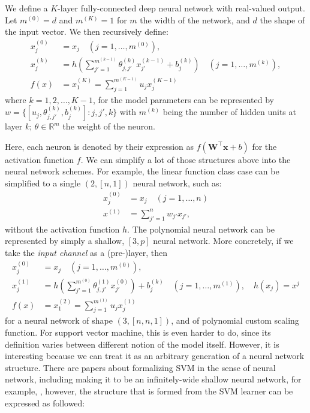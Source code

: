 \begin{definition}
    We define a $K$-layer fully-connected deep neural network with real-valued output. Let $m^{(0)}=d$ and $m^{(K)}=1$ for $m$ the width of the network, and $d$ the shape of the input vector. We then recursively define: 
\begin{align}
    x_{j}^{(0)} &= x_{j} \quad (j=1,\dots,m^{(0)}),\\ 
    x_{j}^{(k)} &= h\left(\sum^{m^{(k-1)}}_{j'=1} \theta_{j,j'}^{(k)}x_{j'}^{(k-1)}+ b_{j}^{(k)}\right)\quad (j=1,\dots,m^{(k)}),\\
    f(x) & = x_{1}^{(K)} = \sum^{m^{(K-1)}}_{j=1} u_{j}x_{j}^{(K-1)}
\end{align}
where $k = 1,2,\dots,K-1$, for the model parameters can be represented by $w=\{[u_{j}, \theta_{j,j'}^{(k)}, b_{j}^{(k)}]: j,j',k\}$ with $m^{(k)}$ being the number of hidden units at layer $k$; $\theta\in \mathbb{R}^{m}$ the weight of the neuron.
\end{definition}

Here, each neuron is denoted by their expression as $f(\mathbf{W}^{\top}\mathbf{x}+b)$ for the activation function $f$. We can simplify a lot of those structures above into the neural network schemes. For example, the linear function class case can be simplified to a single $(2,[n,1])$ neural network, such as: 
\begin{align}
    x^{(0)}_{j} &= x_{j} \quad (j=1,\dots,n)\\
    x^{(1)} &= \sum_{j'=1}^{n} w_{j'}x_{j'}, 
\end{align}
without the activation function $h$. The polynomial neural network can be represented by simply a shallow, $[3,p]$ neural network. More concretely, if we take the \textit{input channel} as a (pre-)layer, then
\begin{align}
    x_{j}^{(0)} &= x_{j} \quad (j=1,\dots,m^{(0)}),\\ 
    x_{j}^{(1)} &= h\left(\sum^{m^{(0)}}_{j'=1} \theta_{j,j'}^{(1)}x_{j'}^{(0)} \right)+b_{j}^{(k)}\quad (j=1,\dots,m^{(1)}),\quad h(x_{j})=x^{j}\\
    f(x) & = x_{1}^{(2)} = \sum^{m^{(1)}}_{j=1} u_{j}x_{j}^{(1)}
\end{align}
for a neural network of shape $(3,[n,n,1])$, and of polynomial custom scaling function. For support vector machine, this is even harder to do, since its definition varies between different notion of the model itself. However, it is interesting because we can treat it as an arbitrary generation of a neural network structure. There are papers about formalizing SVM in the sense of neural network, including making it to be an infinitely-wide shallow neural network, for example, \cite{chen2021equivalence,wang2019svmdsn,zhang2014equivalence}, however, the structure that is formed from the SVM learner can be expressed as followed:

